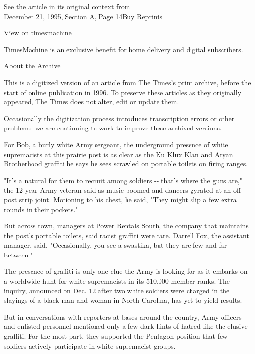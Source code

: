 See the article in its original context from\\
December 21, 1995, Section A, Page
14\href{https://store.nytimes3xbfgragh.onion/collections/new-york-times-page-reprints?utm_source=nytimes\&utm_medium=article-page\&utm_campaign=reprints}{Buy
Reprints}

\href{http://timesmachine.nytimes3xbfgragh.onion/timesmachine/1995/12/21/075175.html}{View
on timesmachine}

TimesMachine is an exclusive benefit for home delivery and digital
subscribers.

About the Archive

This is a digitized version of an article from The Times's print
archive, before the start of online publication in 1996. To preserve
these articles as they originally appeared, The Times does not alter,
edit or update them.

Occasionally the digitization process introduces transcription errors or
other problems; we are continuing to work to improve these archived
versions.

For Bob, a burly white Army sergeant, the underground presence of white
supremacists at this prairie post is as clear as the Ku Klux Klan and
Aryan Brotherhood graffiti he says he sees scrawled on portable toilets
on firing ranges.

"It's a natural for them to recruit among soldiers -\/- that's where the
guns are," the 12-year Army veteran said as music boomed and dancers
gyrated at an off-post strip joint. Motioning to his chest, he said,
"They might slip a few extra rounds in their pockets."

But across town, managers at Power Rentals South, the company that
maintains the post's portable toilets, said racist graffiti were rare.
Darrell Fox, the assistant manager, said, "Occasionally, you see a
swastika, but they are few and far between."

The presence of graffiti is only one clue the Army is looking for as it
embarks on a worldwide hunt for white supremacists in its 510,000-member
ranks. The inquiry, announced on Dec. 12 after two white soldiers were
charged in the slayings of a black man and woman in North Carolina, has
yet to yield results.

But in conversations with reporters at bases around the country, Army
officers and enlisted personnel mentioned only a few dark hints of
hatred like the elusive graffiti. For the most part, they supported the
Pentagon position that few soldiers actively participate in white
supremacist groups.

